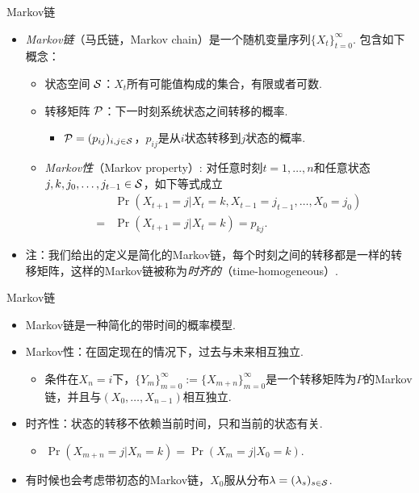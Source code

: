 {Markov链}
\begin{itemize}
    \item \emph{Markov链}（马氏链，Markov chain）是一个随机变量序列$\{X_t\}_{t=0}^{\infty}$. 包含如下概念：
\begin{itemize}
	\item 状态空间 $\MS$：$X_t$所有可能值构成的集合，有限或者可数.
	\item 转移矩阵 $\P$：下一时刻系统状态之间转移的概率.
		\begin{itemize}
        \item $\P=(p_{ij})_{i,j\in \MS}$，$p_{ij}$是从$i$状态转移到$j$状态的概率.
		\end{itemize}		
		\item \emph{Markov性}（Markov property）: 对任意时刻$t=1,\dots,n$和任意状态$j,k,j_0,\dots,j_{t-1}\in \MS$，如下等式成立
		\begin{align*}
		   &\Pr(X_{t+1}=j| X_t=k,X_{t-1}=j_{t-1},\dots,X_0=j_0)\\
		   =& \Pr(X_{t+1}=j| X_{t}=k)=p_{kj}.
		\end{align*}
    \end{itemize}
	\item 注：我们给出的定义是简化的Markov链，每个时刻之间的转移都是一样的转移矩阵，这样的Markov链被称为\emph{时齐的}（time-homogeneous）.
\end{itemize}


{Markov链}
\begin{itemize}
    \item Markov链是一种简化的带时间的概率模型.
    \item Markov性：在固定现在的情况下，过去与未来相互独立.
    \begin{itemize}
        \item 条件在$X_n=i$下，$\{Y_m\}_{m=0}^{\infty}:=\{X_{m+n}\}_{m=0}^{\infty}$是一个转移矩阵为$P$的Markov链，并且与$(X_0,\dots,X_{n-1})$相互独立. %
    \end{itemize}
    \item 时齐性：状态的转移不依赖当前时间，只和当前的状态有关.
    \begin{itemize}
        \item  $\Pr(X_{m+n}=j| X_{n}=k)=\Pr(X_{m}=j| X_{0}=k)$.
    \end{itemize}
    \item 有时候也会考虑带初态的Markov链，$X_0$服从分布$\lambda=(\lambda_s)_{s\in \MS}$.
\end{itemize}


